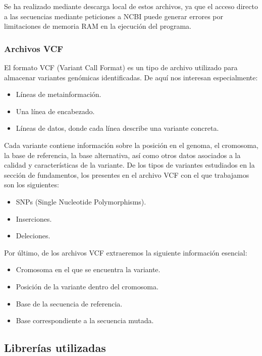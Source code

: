 \documentclass[11pt,spanish,listoffigures,listoftables]{tfgetsinf}
\begin{document}
Se ha realizado mediante descarga local de estos archivos, ya que el acceso directo a las secuencias mediante peticiones a NCBI puede generar errores por limitaciones de memoria RAM en la ejecución del programa. 

\subsubsection{Archivos VCF}

El formato VCF (Variant Call Format) es un tipo de archivo utilizado para almacenar variantes genómicas identificadas. De aquí nos interesan especialmente: 

\begin{itemize}
   \item Líneas de metainformación. 
   \item Una línea de encabezado.
   \item Líneas de datos, donde cada línea describe una variante concreta. 
\end{itemize}

Cada variante contiene información sobre la posición en el genoma, el cromosoma, la base de referencia, la base alternativa, así como otros datos asociados a la calidad y características de la variante. De los tipos de variantes estudiados en la sección de fundamentos, los presentes en el archivo VCF con el que trabajamos son los siguientes: 

\begin{itemize}
   \item SNPs (Single Nucleotide Polymorphisms). 
   \item Inserciones. 
   \item Deleciones.
\end{itemize}

Por último, de los archivos VCF extraeremos la siguiente información esencial: 

\begin{itemize}
   \item Cromosoma en el que se encuentra la variante.
   \item Posición de la variante dentro del cromosoma.  
   \item Base de la secuencia de referencia.
   \item Base correspondiente a la secuencia mutada.
\end{itemize}
 

\subsection{Librerías utilizadas}
\end{document}
